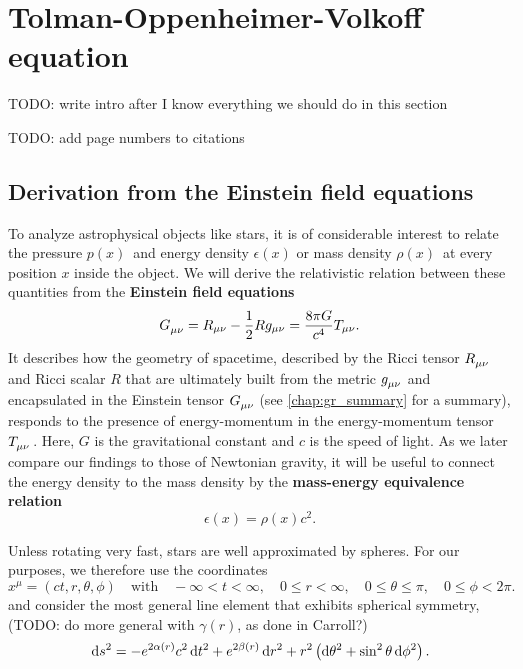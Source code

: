 \chapter{Tolman-Oppenheimer-Volkoff equation}

TODO: write intro after I know everything we should do in this section

TODO: add page numbers to citations

\section{Derivation from the Einstein field equations}
\label{sec:tov}

To analyze astrophysical objects like stars, it is of considerable interest to relate the pressure $p(x)$ and energy density $\epsilon(x)$ or mass density $\rho(x)$ at every position $x$ inside the object.
We will derive the relativistic relation between these quantities from the \textbf{Einstein field equations} \cite[equation 4.44]{ref:carroll}
\begin{equation}
	G\indices{_\mu_\nu} = R_{\mu \nu} - \frac{1}{2} R g_{\mu \nu} = \frac{8 \pi G}{c^4} T_{\mu \nu} .
	\label{eq:einstein}
\end{equation}
It describes how the geometry of spacetime, described by the Ricci tensor $R\indices{_\mu_\nu}$ and Ricci scalar $R$ that are ultimately built from the metric $g\indices{_\mu_\nu}$ and encapsulated in the Einstein tensor $G\indices{_\mu_\nu}$ (see \cref{chap:gr_summary} for a summary), responds to the presence of energy-momentum in the energy-momentum tensor $T\indices{_\mu_\nu}$.
Here, $G$ is the gravitational constant and $c$ is the speed of light.
As we later compare our findings to those of Newtonian gravity, it will be useful to connect the energy density to the mass density by the \textbf{mass-energy equivalence relation}
\begin{equation}
	\epsilon(x) = \rho(x) c^2 .
	\label{eq:tov:mass_energy_equivalence}
\end{equation}

Unless rotating very fast, stars are well approximated by spheres.
For our purposes, we therefore use the coordinates
\begin{equation}
	x^\mu = (c t, r, \theta, \phi)
	\quad \text{with} \quad
	-\infty < t < \infty, \quad
	0 \leq r < \infty, \quad
	0 \leq \theta \leq \pi, \quad
	0 \leq \phi < 2 \pi .
\end{equation}
and consider the most general line element that exhibits spherical symmetry, \cite[§ 94-95]{ref:tolman}
(TODO: do more general with $\gamma(r)$, as done in Carroll?)
\begin{equation}
	\mathop{}\!\mathrm{d} s^2 = -e^{2 \alpha(r)} c^2 \mathop{}\!\mathrm{d} t^2 + e^{2 \beta(r)} \mathop{}\!\mathrm{d} r^2 + r^2 \left( \mathop{}\!\mathrm{d} \theta^2 + \sin^2 \theta \mathop{}\!\mathrm{d} \phi^2 \right) .
\end{equation}

